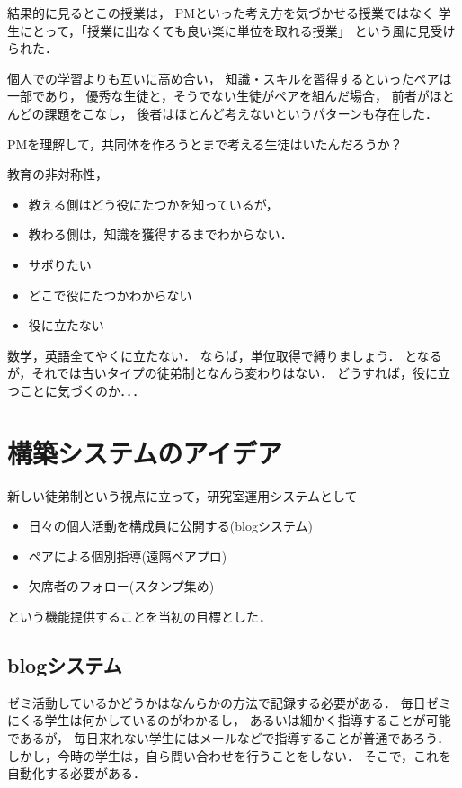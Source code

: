 \documentclass[a4,p11]{article}
\begin{document}
結果的に見るとこの授業は，
PMといった考え方を気づかせる授業ではなく
学生にとって，「授業に出なくても良い楽に単位を取れる授業」
という風に見受けられた．

個人での学習よりも互いに高め合い，
知識・スキルを習得するといったペアは一部であり，
優秀な生徒と，そうでない生徒がペアを組んだ場合，
前者がほとんどの課題をこなし，
後者はほとんど考えないというパターンも存在した．

PMを理解して，共同体を作ろうとまで考える生徒はいたんだろうか？

教育の非対称性，
\begin{itemize}
\item 教える側はどう役にたつかを知っているが，
\item 教わる側は，知識を獲得するまでわからない．

\item サボりたい
\item どこで役にたつかわからない
\item 役に立たない
\end{itemize}
数学，英語全てやくに立たない．
ならば，単位取得で縛りましょう．
となるが，それでは古いタイプの徒弟制となんら変わりはない．
どうすれば，役に立つことに気づくのか．．．

\section{構築システムのアイデア}
\label{sec:org752686a}
新しい徒弟制という視点に立って，研究室運用システムとして
\begin{itemize}
\item 日々の個人活動を構成員に公開する(blogシステム)
\item ペアによる個別指導(遠隔ペアプロ)
\item 欠席者のフォロー(スタンプ集め)
\end{itemize}
という機能提供することを当初の目標とした．

\subsection{blogシステム}
\label{sec:org2907fae}
ゼミ活動しているかどうかはなんらかの方法で記録する必要がある．
毎日ゼミにくる学生は何かしているのがわかるし，
あるいは細かく指導することが可能であるが，
毎日来れない学生にはメールなどで指導することが普通であろう．
しかし，今時の学生は，自ら問い合わせを行うことをしない．
そこで，これを自動化する必要がある．
\end{document}
